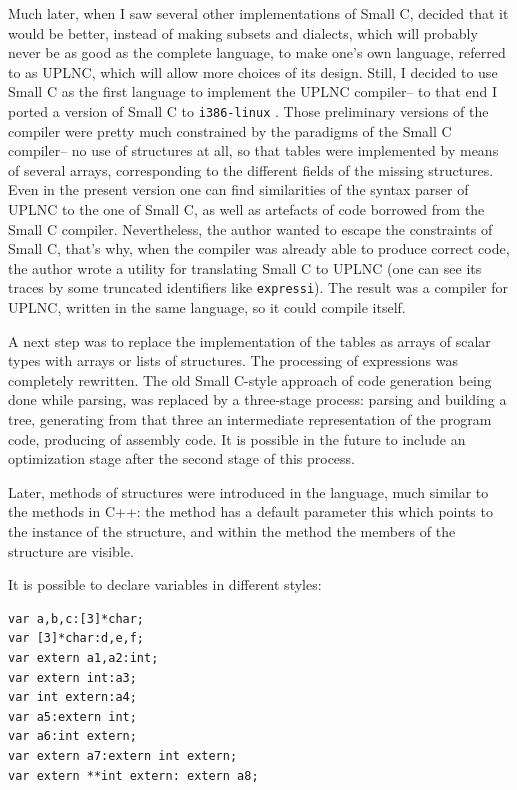 \documentclass[10pt]{article}
\begin{document}
Much later, when I saw several other implementations of Small C,
decided that it would be better, instead of making subsets and
dialects, which will probably never be as good as the complete language, to
make one's own language, referred to as UPLNC, which will allow more
choices of its design. Still, I decided to use Small C as the first language to
implement the UPLNC compiler-- to that end I ported a version of Small C
to \texttt{i386-linux} \cite{SmCport}. Those preliminary versions of the
compiler 
were pretty much constrained by the paradigms of the Small C compiler--
no use of structures at all, so that tables were implemented by means of
several arrays, corresponding to the different fields of the missing
structures. Even in the present version one can find similarities of the
syntax parser of UPLNC to the one of Small C, as well as artefacts of
code borrowed from the Small C compiler. Nevertheless, the author
wanted to escape the constraints of Small C, that's why, when the
compiler was already able to produce correct code, the author wrote a
utility for translating Small C to UPLNC (one can see its traces by some
truncated identifiers like \texttt{expressi}). The result was a compiler for
UPLNC, written in the same language, so it could compile itself.

A next step was to replace the implementation of the tables as arrays of
scalar types with arrays or lists of structures. The processing of
expressions was completely rewritten. The old Small C-style approach of
code generation being done while parsing, was replaced by a three-stage
process: parsing and building a tree, generating from that three an
intermediate representation of the program code, producing of assembly
code. It is possible in the future to include an optimization stage
after the second 
stage of this process.

Later, methods of structures were introduced in the language, much
similar to the methods in C++: the method has a default parameter
{\textsf{this}} which points to the instance of the structure, and within
the method the members of the structure are visible.

It is possible to declare variables in different styles:
\begin{verbatim}
var a,b,c:[3]*char;
var [3]*char:d,e,f;
var extern a1,a2:int;
var extern int:a3;
var int extern:a4;
var a5:extern int;
var a6:int extern;
var extern a7:extern int extern;
var extern **int extern: extern a8;
\end{verbatim}
\end{document}
